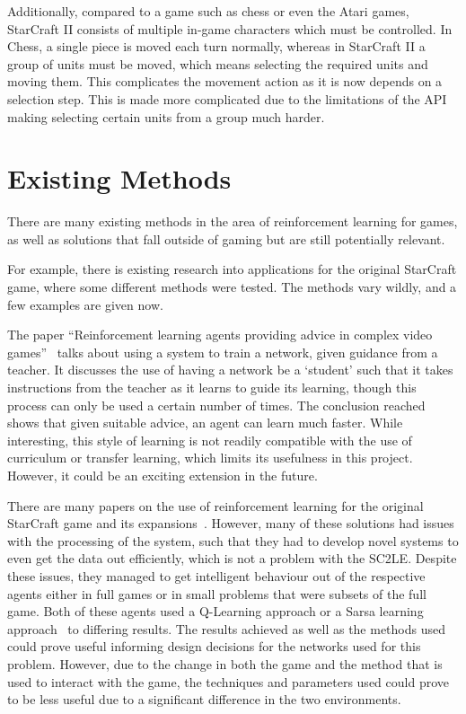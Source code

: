 Additionally, compared to a game such as chess or even the Atari games,
StarCraft II consists of multiple in-game characters which must be controlled.
In Chess, a single piece is moved each turn normally, whereas in StarCraft II a
group of units must be moved, which means selecting the required units and
moving them. This complicates the movement action as it is now depends on a
selection step. This is made more complicated due to the limitations of the API
making selecting certain units from a group much harder.

\section{Existing Methods}

There are many existing methods in the area of reinforcement learning for games,
as well as solutions that fall outside of gaming but are still potentially
relevant.

For example, there is existing research into applications for the original
StarCraft game, where some different methods were tested. The methods vary
wildly, and a few examples are given now.

The paper ``Reinforcement learning agents providing advice in complex video
games''~\cite{taylor2014reinforcement} talks about using a system to train a
network, given guidance from a teacher. It discusses the use of having a network
be a `student' such that it takes instructions from the teacher as it learns to
guide its learning, though this process can only be used a certain number of
times. The conclusion reached shows that given suitable advice, an agent can
learn much faster. While interesting, this style of learning is not readily
compatible with the use of curriculum or transfer learning, which limits its
usefulness in this project. However, it could be an exciting extension in the
future.

There are many papers on the use of reinforcement learning for the original
StarCraft game and its expansions~\cite{wender2012applying,
shantia2011connectionist}. However, many of these solutions had issues with the
processing of the system, such that they had to develop novel systems to even
get the data out efficiently, which is not a problem with the SC2LE\@. Despite
these issues, they managed to get intelligent behaviour out of the respective
agents either in full games or in small problems that were subsets of the full
game. Both of these agents used a Q-Learning approach or a Sarsa learning
approach~\cite{sutton1996generalization} to differing results. The results
achieved as well as the methods used could prove useful informing design
decisions for the networks used for this problem. However, due to the change in
both the game and the method that is used to interact with the game, the
techniques and parameters used could prove to be less useful due to a
significant difference in the two environments.

